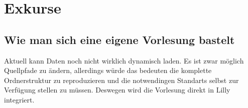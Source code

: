 \renewcommand{\arraystretch}{1.5}
\chapter{Exkurse}

\section{Wie man sich eine eigene Vorlesung bastelt}
\begin{bemerkung}[Disclaimer]
    Aktuell kann \Jake Daten noch nicht wirklich dynamisch laden. Es ist zwar möglich Quellpfade zu ändern,
    allerdings würde das bedeuten die komplette Ordnerstruktur zu reproduzieren und die notwendingen Standarts selbst zur Verfügung stellen zu müssen. Deswegen wird die Vorlesung direkt in Lilly integriert.
\end{bemerkung}


